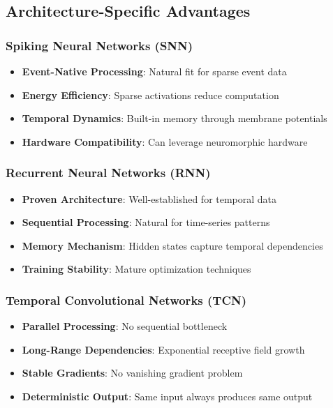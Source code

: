 \documentclass[12pt,a4paper]{article}
\begin{document}
\subsection{Architecture-Specific Advantages}

\subsubsection{Spiking Neural Networks (SNN)}
\begin{itemize}
    \item \textbf{Event-Native Processing}: Natural fit for sparse event data
    \item \textbf{Energy Efficiency}: Sparse activations reduce computation
    \item \textbf{Temporal Dynamics}: Built-in memory through membrane potentials
    \item \textbf{Hardware Compatibility}: Can leverage neuromorphic hardware
\end{itemize}

\subsubsection{Recurrent Neural Networks (RNN)}
\begin{itemize}
    \item \textbf{Proven Architecture}: Well-established for temporal data
    \item \textbf{Sequential Processing}: Natural for time-series patterns
    \item \textbf{Memory Mechanism}: Hidden states capture temporal dependencies
    \item \textbf{Training Stability}: Mature optimization techniques
\end{itemize}

\subsubsection{Temporal Convolutional Networks (TCN)}
\begin{itemize}
    \item \textbf{Parallel Processing}: No sequential bottleneck
    \item \textbf{Long-Range Dependencies}: Exponential receptive field growth
    \item \textbf{Stable Gradients}: No vanishing gradient problem
    \item \textbf{Deterministic Output}: Same input always produces same output
\end{itemize}
\end{document}
